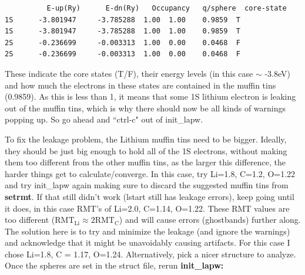 \documentclass[12pt]{article}
\begin{document}
\begin{itemize}
	\begin{lstlisting}
          E-up(Ry)      E-dn(Ry)   Occupancy   q/sphere  core-state
1S      -3.801947     -3.785288  1.00  1.00    0.9859  T
1S      -3.801947     -3.785288  1.00  1.00    0.9859  T
2S      -0.236699     -0.003313  1.00  0.00    0.0468  F
2S      -0.236699     -0.003313  1.00  0.00    0.0468  F
	\end{lstlisting}
	
	These indicate the core states (T/F), their energy levels (in this case $\sim$ -3.8eV) and how much the electrons in these states are contained in the muffin tins (0.9859).  As this is less than 1, it means that some 1S lithium electron is leaking out of the muffin tins, which is why there should now be all kinds of warnings popping up.  So go ahead and ``ctrl-c" out of init\_lapw.
	
\end{itemize}  

To fix the leakage problem, the Lithium muffin tins need to be bigger.   Ideally, they should be just big enough to hold all of the 1S electrons, without making them too different from the other muffin tins, as the larger this difference, the harder things get to calculate/converge.  In this case, try Li=1.8,  C=1.2, O=1.22 and try init\_lapw again making sure to discard the suggested muffin tins from \textbf{setrmt}. If that still didn't work (lstart still has leakage errors), keep going until it does, in this case RMT's of Li=2.0,  C=1.14, O=1.22.  These RMT values are too different ($\mathrm{RMT_{Li}} \approx 2\mathrm{RMT_C}$) and will cause errors  (ghostbands) further along.  The solution here is to try and minimize the leakage (and ignore the warnings) and acknowledge that it might be unavoidably causing artifacts. For this case I chose Li=1.8, C = 1.17, O=1.24. Alternatively, pick a nicer structure to analyze.  Once the spheres are set in the struct file, rerun \textbf{init\_lapw:}
\end{document}
